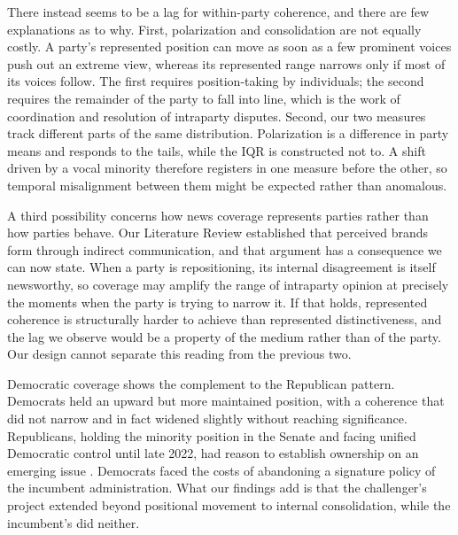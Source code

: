 There instead seems to be a lag for within-party coherence, and there are few explanations as to why. First, polarization and consolidation are not equally costly. A party's represented position can move as soon as a few prominent voices push out an extreme view, whereas its represented range narrows only if most of its voices follow. The first requires position-taking by individuals; the second requires the remainder of the party to fall into line, which is the work of coordination and resolution of intraparty disputes. Second, our two measures track different parts of the same distribution. Polarization is a difference in party means and responds to the tails, while the IQR is constructed not to. A shift driven by a vocal minority therefore registers in one measure before the other, so temporal misalignment between them might be expected rather than anomalous.

A third possibility concerns how news coverage represents parties rather than how parties behave. Our Literature Review established that perceived brands form through indirect communication, and that argument has a consequence we can now state. When a party is repositioning, its internal disagreement is itself newsworthy, so coverage may amplify the range of intraparty opinion at precisely the moments when the party is trying to narrow it. If that holds, represented coherence is structurally harder to achieve than represented distinctiveness, and the lag we observe would be a property of the medium rather than of the party. Our design cannot separate this reading from the previous two.

Democratic coverage shows the complement to the Republican pattern. Democrats held an upward but more maintained position, with a coherence that did not narrow and in fact widened slightly without reaching significance. Republicans, holding the minority position in the Senate and facing unified Democratic control until late 2022, had reason to establish ownership on an emerging issue \citep{abou-chadiModerateNecessaryRole2016,kollbergChallengerAdvantageHow2025}. Democrats faced the costs of abandoning a signature policy of the incumbent administration. What our findings add is that the challenger's project extended beyond positional movement to internal consolidation, while the incumbent's did neither.

